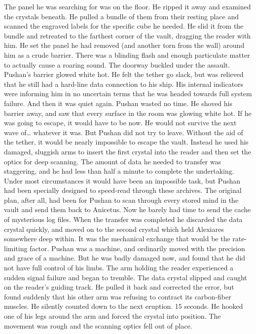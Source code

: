 \documentclass[a4paper]{article}
\begin{document}
The panel he was searching for was on the floor. He ripped it away and examined the crystals beneath. He pulled a bundle of them from their resting place and scanned the engraved labels for the specific cube he needed. He slid it from the bundle and retreated to the farthest corner of the vault, dragging the reader with him. He set the panel he had removed (and another torn from the wall) around him as a crude barrier.
There was a blinding flash and enough particulate matter to actually cause a roaring sound. The doorway buckled under the assault. Pushan’s barrier glowed white hot. He felt the tether go slack, but was relieved that he still had a hard-line data connection to his ship. His internal indicators were informing him in no uncertain terms that he was headed towards full system failure. And then it was quiet again.
Pushan wasted no time. He shoved his barrier away, and saw that every surface in the room was glowing white hot. If he was going to escape, it would have to be now. He would not survive the next wave of… whatever it was.
But Pushan did not try to leave. Without the aid of the tether, it would be nearly impossible to escape the vault. Instead he used his damaged, sluggish arms to insert the first crystal into the reader and then set the optics for deep scanning.
The amount of data he needed to transfer was staggering, and he had less than half a minute to complete the undertaking. Under most circumstances it would have been an impossible task, but Pushan had been specially designed to speed-read through these archives. The original plan, after all, had been for Pushan to scan through every stored mind in the vault and send them back to Anicetus. Now he barely had time to send the cache of mysterious log files.
When the transfer was completed he discarded the data crystal quickly, and moved on to the second crystal which held Alexiares somewhere deep within. It was the mechanical exchange that would be the rate-limiting factor. Pushan was a machine, and ordinarily moved with the precision and grace of a machine. But he was badly damaged now, and found that he did not have full control of his limbs.
The arm holding the reader experienced a sudden signal failure and began to tremble. The data crystal slipped and caught on the reader’s guiding track. He pulled it back and corrected the error, but found suddenly that his other arm was refusing to contract its carbon-fiber muscles.
He silently counted down to the next eruption. 15 seconds.
He hooked one of his legs around the arm and forced the crystal into position. The movement was rough and the scanning optics fell out of place.
\end{document}
